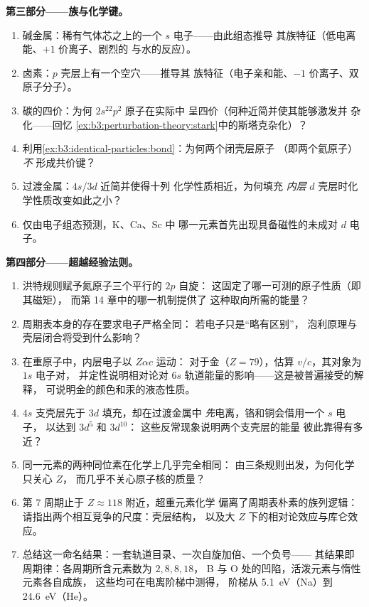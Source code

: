 \begin{problem}
\medskip\noindent\textbf{第三部分——族与化学键。}
\begin{enumerate}[resume]
  \item 碱金属：稀有气体芯之上的一个 $s$ 电子——由此组态推导
        其族特征（低电离能、$+1$ 价离子、剧烈的
        与水的反应）。
  \item 卤素：$p$ 壳层上有一个空穴——推导其
        族特征（电子亲和能、$-1$ 价离子、双原子分子）。
  \item 碳的四价：为何 $2s^22p^2$ 原子在实际中
        呈四价（何种近简并使其能够激发并
        杂化——回忆
        \cref{ex:b3:perturbation-theory:stark}中的斯塔克杂化）？
  \item 利用\cref{ex:b3:identical-particles:bond}：为何两个闭壳层原子
        （即两个氦原子）\emph{不}
        形成共价键？
  \item 过渡金属：$4s$/$3d$ 近简并使得十列
        化学性质相近，为何填充
        \emph{内层} $d$ 壳层时化学性质改变如此之小？
  \item 仅由电子组态预测，K、Ca、Sc 中
        哪一元素首先出现具备磁性的未成对 $d$ 电子。
\end{enumerate}

\medskip\noindent\textbf{第四部分——超越经验法则。}
\begin{enumerate}[resume]
  \item 洪特规则赋予氮原子三个平行的 $2p$ 自旋：
        这固定了哪一可测的原子性质（即其磁矩），
        而第 14 章中的哪一机制提供了
        这种取向所需的能量？
  \item 周期表本身的存在要求电子严格全同：
        若电子只是“略有区别”，
        泡利原理与壳层闭合将受到什么影响？
  \item 在重原子中，内层电子以 $Z\alpha c$ 运动：
        对于金（$Z = 79$），估算 $v/c$，其对象为 $1s$ 电子对，
        并定性说明相对论对 $6s$
        轨道能量的影响——这是被普遍接受的解释，
        可说明金的颜色和汞的液态性质。
  \item $4s$ 支壳层先于 $3d$ 填充，却在过渡金属中
        \emph{先}电离，铬和铜会借用一个 $s$ 电子，
        以达到 $3d^5$ 和 $3d^{10}$：
        这些反常现象说明两个支壳层的能量
        彼此靠得有多近？
  \item 同一元素的两种同位素在化学上几乎完全相同：
        由三条规则出发，为何化学只关心 $Z$，
        而几乎不关心原子核的质量？
  \item 第 7 周期止于 $Z \approx 118$ 附近，超重元素化学
        偏离了周期表朴素的族列逻辑：
        请指出两个相互竞争的尺度：壳层结构，
        以及大 $Z$ 下的相对论效应与库仑效应。
  \item 总结这一命名结果：一套轨道目录、一次自旋加倍、一个负号——
        其结果即周期律：各周期所含元素数为 $2, 8, 8, 18$，
        B 与 O 处的凹陷，活泼元素与惰性元素各自成族，
        这些均可在电离阶梯中测得，
        阶梯从 \qty{5.1}{eV}（Na）到
        \qty{24.6}{eV}（He）。
\end{enumerate}
\end{problem}
